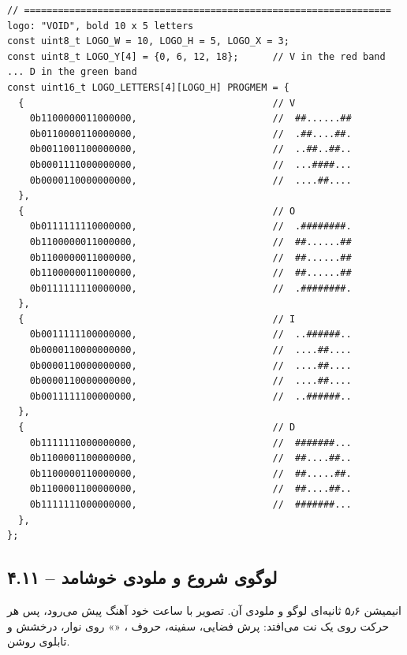 \documentclass[11pt,a4paper]{article}
\begin{document}
\begin{latin}
\begin{lstlisting}[language=Arduino]
// ================================================================= logo: "VOID", bold 10 x 5 letters
const uint8_t LOGO_W = 10, LOGO_H = 5, LOGO_X = 3;
const uint8_t LOGO_Y[4] = {0, 6, 12, 18};      // V in the red band ... D in the green band
const uint16_t LOGO_LETTERS[4][LOGO_H] PROGMEM = {
  {                                            // V
    0b1100000011000000,                        //  ##......##
    0b0110000110000000,                        //  .##....##.
    0b0011001100000000,                        //  ..##..##..
    0b0001111000000000,                        //  ...####...
    0b0000110000000000,                        //  ....##....
  },
  {                                            // O
    0b0111111110000000,                        //  .########.
    0b1100000011000000,                        //  ##......##
    0b1100000011000000,                        //  ##......##
    0b1100000011000000,                        //  ##......##
    0b0111111110000000,                        //  .########.
  },
  {                                            // I
    0b0011111100000000,                        //  ..######..
    0b0000110000000000,                        //  ....##....
    0b0000110000000000,                        //  ....##....
    0b0000110000000000,                        //  ....##....
    0b0011111100000000,                        //  ..######..
  },
  {                                            // D
    0b1111111000000000,                        //  #######...
    0b1100001100000000,                        //  ##....##..
    0b1100000110000000,                        //  ##.....##.
    0b1100001100000000,                        //  ##....##..
    0b1111111000000000,                        //  #######...
  },
};
\end{lstlisting}

\end{latin}

\clearpage
\subsection*{۴.۱۱  – لوگوی شروع و ملودی خوشامد}
انیمیشن ۵٫۶ ثانیه‌ای لوگو و ملودی آن. تصویر با ساعت خود آهنگ پیش می‌رود، پس هر حرکت روی یک نت می‌افتد: پرش فضایی، سفینه، حروف ، «» روی نوار، درخشش و تابلوی روشن.
\end{document}
